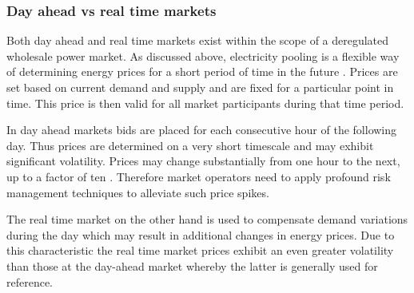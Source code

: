 \subsubsection{Day ahead vs real time markets}

Both day ahead and real time markets exist within the scope of a deregulated wholesale power market. As discussed above, electricity pooling is a flexible way of determining energy prices for a short period of time in the future \cite{hogan1997reshaping}. Prices are set based on current demand and supply and are fixed for a particular point in time. This price is then valid for all market participants during that time period. 

In day ahead markets bids are placed for each consecutive hour of the following day. Thus prices are determined on a very short timescale and may exhibit significant volatility. Prices may change substantially from one hour to the next, up to a factor of ten \cite{huisman2007hourly}. Therefore market operators need to apply profound risk management techniques to alleviate such price spikes. 

The real time market on the other hand is used to compensate demand variations during the day which may result in additional changes in energy prices. 
Due to this characteristic the real time market prices exhibit an even greater volatility than those at the day-ahead market whereby the latter is generally used for reference. 




%

